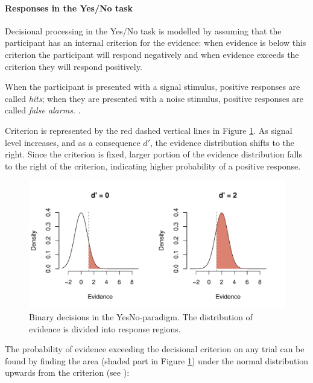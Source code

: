 \documentclass{article}\usepackage{knitr}
\begin{document}
\paragraph{Responses in the Yes/No task}

Decisional processing in the Yes/No task is modelled by assuming that the participant has an internal criterion for the evidence: when evidence is below this criterion the participant will respond negatively and when evidence exceeds the criterion they will respond  positively.

When the participant is presented with a signal stimulus, positive responses are called \textit{hits}; when they  are presented with a noise stimulus, positive responses are called \textit{false alarms}. \citep{wickens2002, kingdomprins2010}. 

Criterion is represented by the red dashed vertical lines in Figure \ref{fig:yesno}. As signal level increases, and as a consequence $d'$, the evidence distribution shifts to the right. Since the criterion is fixed, larger portion of the evidence distribution falls to the right of the criterion, indicating higher probability of a positive response.

\begin{figure}[!htb]
\centering
\begin{knitrout}
\color{fgcolor}
\includegraphics[width=\maxwidth]{figure/unnamed-chunk-5-1} 
\end{knitrout}
\caption{Binary decisions in the YesNo-paradigm. The distribution of evidence is divided into response regions.}
\label{fig:yesno}
\end{figure}

The probability of evidence exceeding the decisional criterion on any trial can be found by finding the area (shaded part in Figure \ref{fig:yesno}) under the normal distribution upwards from the criterion (see \citet{wickens2002, kingdomprins2010}):
\end{document}
